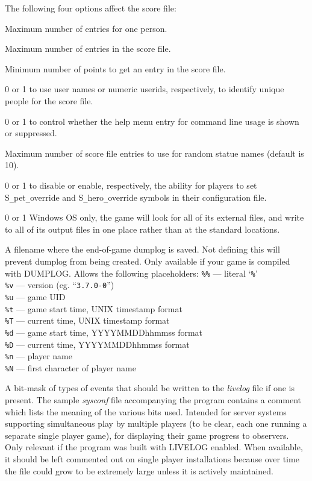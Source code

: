 The following four options affect the score file:
\blist {}
\item[\ib{PERSMAX}]
Maximum number of entries for one person.
\item[\ib{ENTRYMAX}]
Maximum number of entries in the score file.
\item[\ib{POINTSMIN}]
Minimum number of points to get an entry in the score file.
\item[\ib{PERS\verb+_+IS\verb+_+UID}]
0 or 1 to use user names or numeric userids, respectively, to identify
unique people for the score file.
\item[\ib{HIDEUSAGE}]
0 or 1 to control whether the help menu entry for command
line usage is shown or suppressed.
\item[\ib{MAX\verb+_+STATUENAME\verb+_+RANK}]
Maximum number of score file entries to use for
random statue names (default is 10).
\item[\ib{ACCESSIBILITY}]
0 or 1 to disable or enable, respectively, the ability for players
to set S\verb+_+pet\verb+_+override and S\verb+_+hero\verb+_+override 
symbols in their configuration file.
\item[\ib{PORTABLE\verb+_+DEVICE\verb+_+PATHS}]
0 or 1 Windows OS only, the game will look for all of its external
files, and write to all of its output files in one place 
rather than at the standard locations.
\item[\ib{DUMPLOGFILE}]
A filename where the end-of-game dumplog is saved.
Not defining this will prevent dumplog from being created.
Only available if your game is compiled with DUMPLOG.
Allows the following placeholders:
{\tt \%\%}  --- literal `{\tt \%}'\\
{\tt \%v}  --- version (eg. ``{\tt 3.7.0-0}'')\\
{\tt \%u}  --- game UID\\
{\tt \%t}  --- game start time, UNIX timestamp format\\
{\tt \%T}  --- current time, UNIX timestamp format\\
{\tt \%d}  --- game start time, YYYYMMDDhhmmss format\\
{\tt \%D}  --- current time, YYYYMMDDhhmmss format\\
{\tt \%n}  --- player name\\
{\tt \%N}  --- first character of player name
\item[\ib{LIVELOG}]
A bit-mask of types of events that should be written to
the {\it livelog\/} file if one is present.
The sample {\it sysconf\/} file accompanying the program contains a
comment which lists the meaning of the various bits used.
Intended for server systems supporting simultaneous play by multiple
players (to be clear, each one running a separate single player game),
for displaying their game progress to observers.
Only relevant if the program was built with LIVELOG enabled.
When available, it should be left commented out on single player
installations because over time the file could grow to be extremely
large unless it is actively maintained.
\elist

